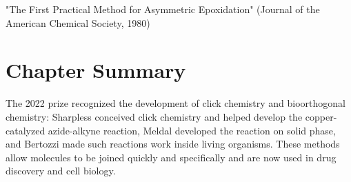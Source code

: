 "The First Practical Method for Asymmetric Epoxidation" (Journal of the American Chemical Society, 1980)

\clearpage

\section*{Chapter Summary}

The 2022 prize recognized the development of click chemistry and bioorthogonal chemistry: Sharpless conceived click chemistry and helped develop the copper-catalyzed azide-alkyne reaction, Meldal developed the reaction on solid phase, and Bertozzi made such reactions work inside living organisms. These methods allow molecules to be joined quickly and specifically and are now used in drug discovery and cell biology.
